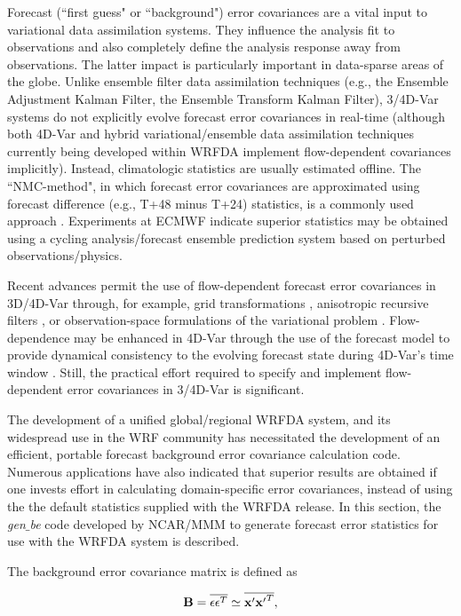 Forecast (``first guess" or ``background") error covariances are a vital input to variational 
data assimilation systems. They influence the analysis fit to observations and also 
completely define the analysis response away from observations. The latter impact is 
particularly important in data-sparse areas of the globe. Unlike ensemble filter data 
assimilation techniques (e.g., the Ensemble Adjustment Kalman Filter, the Ensemble 
Transform Kalman Filter), 3/4D-Var systems do not explicitly evolve forecast error 
covariances in real-time (although both 4D-Var and hybrid variational/ensemble data assimilation techniques currently being developed within WRFDA implement flow-dependent covariances implicitly). Instead, climatologic statistics are usually estimated offline. 
The ``NMC-method", in which forecast error covariances are approximated using 
forecast difference (e.g., T+48 minus T+24) statistics, is a commonly used approach 
\citep{parrish92}. Experiments at ECMWF \citep{fisher03} indicate superior statistics may 
be obtained using a cycling analysis/forecast ensemble prediction
system based on perturbed observations/physics.

Recent advances permit the use of flow-dependent forecast error
covariances in 3D/4D-Var through, for example, grid transformations
\citep{desroziers97}, anisotropic recursive filters
\citep{wu02, purser03},
or observation-space formulations of the variational 
problem \citep{daley01}. Flow-dependence may be enhanced in 4D-Var 
through the use of the forecast model to provide dynamical consistency to the evolving 
forecast state during 4D-Var's time window \citep{rabier98}. Still, the practical effort 
required to specify and implement flow-dependent error covariances in 3/4D-Var is 
significant.

The development of a unified global/regional WRFDA system, and its widespread use
in the WRF community has necessitated the development of an efficient, portable forecast 
background error covariance calculation code. Numerous applications have also indicated
that superior results are obtained if one invests effort in calculating domain-specific 
error covariances, instead of using the the default statistics supplied with the WRFDA 
release. In this section, the {\it gen$\_$be} code developed by NCAR/MMM to generate 
forecast error statistics for use with the WRFDA system is described.

The background error covariance matrix is defined as 

\begin{equation}
{\bf B}=\overline{\epsilon \epsilon^{T}} \simeq \overline{{\bf x'}{\bf x'}^{T}},
\label{var-b}
\end{equation}

